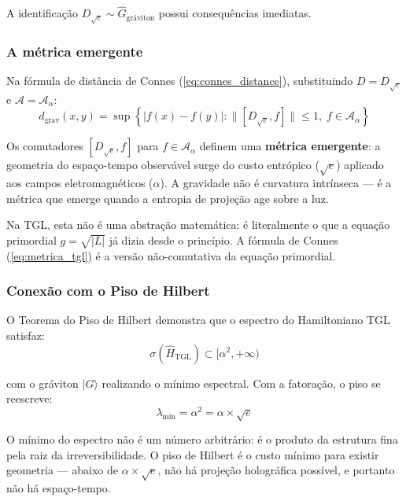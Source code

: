 \documentclass[12pt,a4paper,twoside]{article}
\newcommand{\alphaii}{\alpha^{2}}
\begin{document}
A identificação $D_{\sqrt{e}} \sim \hat{G}_{\text{gráviton}}$ possui consequências imediatas.

\subsubsection{A métrica emergente}

Na fórmula de distância de Connes (\ref{eq:connes_distance}), substituindo $D = D_{\sqrt{e}}$ e $\mathcal{A} = \mathcal{A}_\alpha$:
\begin{equation}
d_{\text{grav}}(x,y) = \sup\left\{|f(x) - f(y)| : \|[D_{\sqrt{e}}, f]\| \leq 1,\; f \in \mathcal{A}_\alpha\right\}
\label{eq:metrica_tgl}
\end{equation}

Os comutadores $[D_{\sqrt{e}}, f]$ para $f \in \mathcal{A}_\alpha$ definem uma \textbf{métrica emergente}: a geometria do espaço-tempo observável surge do custo entrópico ($\sqrt{e}$) aplicado aos campos eletromagnéticos ($\alpha$). A gravidade não é curvatura intrínseca --- é a métrica que emerge quando a entropia de projeção age sobre a luz.

Na TGL, esta não é uma abstração matemática: é literalmente o que a equação primordial $g = \sqrt{|L|}$ já dizia desde o princípio. A fórmula de Connes (\ref{eq:metrica_tgl}) é a versão não-comutativa da equação primordial.

\subsubsection{Conexão com o Piso de Hilbert}

O Teorema do Piso de Hilbert \cite{Miguel2026Graviton} demonstra que o espectro do Hamiltoniano TGL satisfaz:
\begin{equation}
\sigma(\hat{H}_{\text{TGL}}) \subset [\alphaii, +\infty)
\end{equation}

\noindent com o gráviton $|G\rangle$ realizando o mínimo espectral. Com a fatoração, o piso se reescreve:
\begin{equation}
\lambda_{\min} = \alphaii = \alpha \times \sqrt{e}
\end{equation}

O mínimo do espectro não é um número arbitrário: é o produto da estrutura fina pela raiz da irreversibilidade. O piso de Hilbert é o custo mínimo para existir geometria --- abaixo de $\alpha \times \sqrt{e}$, não há projeção holográfica possível, e portanto não há espaço-tempo.
\end{document}
